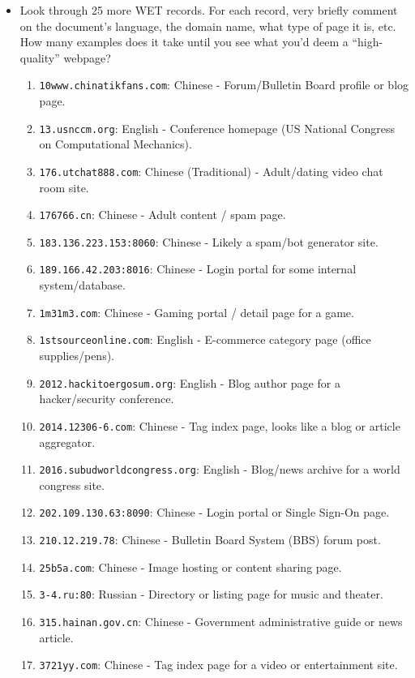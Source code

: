 \documentclass[letterpaper]{article}
\begin{document}
\begin{itemize}
	\item[(d)] Look through 25 more WET records. For each record, very briefly comment on the document’s language, the domain name, what type of page it is, etc. How many examples does it take until you see what you’d deem a “high-quality” webpage?

	\begin{enumerate}
		\item \texttt{10www.chinatikfans.com}: Chinese - Forum/Bulletin Board profile or blog page.
		\item \texttt{13.usnccm.org}: English - Conference homepage (US National Congress on Computational Mechanics).
		\item \texttt{176.utchat888.com}: Chinese (Traditional) - Adult/dating video chat room site.
		\item \texttt{176766.cn}: Chinese - Adult content / spam page.
		\item \texttt{183.136.223.153:8060}: Chinese - Likely a spam/bot generator site.
		\item \texttt{189.166.42.203:8016}: Chinese - Login portal for some internal system/database.
		\item \texttt{1m31m3.com}: Chinese - Gaming portal / detail page for a game.
		\item \texttt{1stsourceonline.com}: English - E-commerce category page (office supplies/pens).
		\item \texttt{2012.hackitoergosum.org}: English - Blog author page for a hacker/security conference.
		\item \texttt{2014.12306-6.com}: Chinese - Tag index page, looks like a blog or article aggregator.
		\item \texttt{2016.subudworldcongress.org}: English - Blog/news archive for a world congress site.
		\item \texttt{202.109.130.63:8090}: Chinese - Login portal or Single Sign-On page.
		\item \texttt{210.12.219.78}: Chinese - Bulletin Board System (BBS) forum post.
		\item \texttt{25b5a.com}: Chinese - Image hosting or content sharing page.
		\item \texttt{3-4.ru:80}: Russian - Directory or listing page for music and theater.
		\item \texttt{315.hainan.gov.cn}: Chinese - Government administrative guide or news article.
		\item \texttt{3721yy.com}: Chinese - Tag index page for a video or entertainment site.

\end{enumerate}
\end{itemize}
\end{document}
